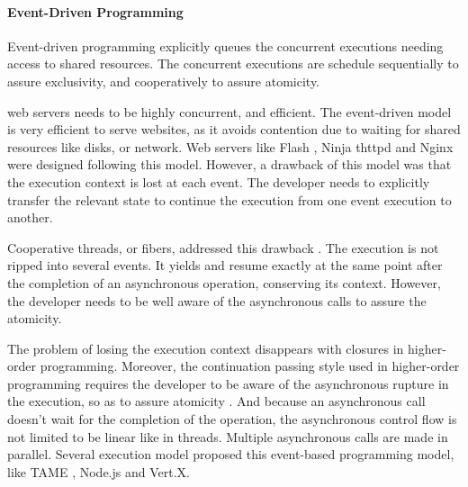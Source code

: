 \paragraph{Event-Driven Programming}

Event-driven programming explicitly queues the concurrent executions needing access to shared resources.
The concurrent executions are schedule sequentially to assure exclusivity, and cooperatively to assure atomicity.

web servers needs to be highly concurrent, and efficient.
The event-driven model is very efficient to serve websites, as it avoids contention due to waiting for shared resources like disks, or network.
Web servers like Flash \cite{Pai1999}, Ninja \cite{Gribble2001} thttpd and Nginx were designed following this model.
However, a drawback of this model was that the execution context is lost at each event.
The developer needs to explicitly transfer the relevant state to continue the execution from one event execution to another.

Cooperative threads, or fibers, addressed this drawback \cite{Adya2002,Behren2003a}.
The execution is not ripped into several events.
It yields and resume exactly at the same point after the completion of an asynchronous operation, conserving its context.
However, the developer needs to be well aware of the asynchronous calls to assure the atomicity.

The problem of losing the execution context disappears with closures in higher-order programming.
Moreover, the continuation passing style used in higher-order programming requires the developer to be aware of the asynchronous rupture in the execution, so as to assure atomicity \cite{Sussman1998}.
And because an asynchronous call doesn't wait for the completion of the operation, the asynchronous control flow is not limited to be linear like in threads. 
Multiple asynchronous calls are made in parallel.
Several execution model proposed this event-based programming model, like TAME \cite{Krohn2007}, Node.js and Vert.X.

